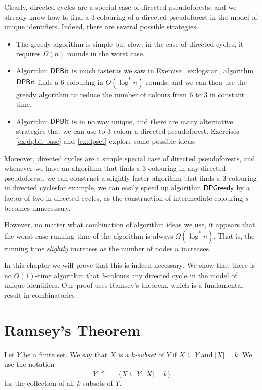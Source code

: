 Clearly, directed cycles are a special case of directed pseudoforests, and we already know how to find a $3$-colouring of a directed pseudoforest in the model of unique identifiers. Indeed, there are several possible strategies.
\begin{itemize}
    \item The greedy algorithm is simple but slow; in the case of directed cycles, it requires $\Omega(n)$ rounds in the worst case.
    \item Algorithm $\textsf{DPBit}$ is much faster\mydash as we saw in Exercise~\ref{ex:logstar}, algorithm $\textsf{DPBit}$ finds a $6$-colouring in $O(\log^* n)$ rounds, and we can then use the greedy algorithm to reduce the number of colours from $6$ to $3$ in constant time.
    \item Algorithm $\textsf{DPBit}$ is in no way unique, and there are many alternative strategies that we can use to $3$-colour a directed pseudoforest. Exercises \ref{ex:dpbit-base} and \ref{ex:dpset} explore some possible ideas.
\end{itemize}
Moreover, directed cycles are a simple special case of directed pseudoforests, and whenever we have an algorithm that finds a $3$-colouring in any directed pseudoforest, we can construct a slightly faster algorithm that finds a $3$-colouring in directed cycles\mydash for example, we can easily speed up algorithm $\textsf{DPGreedy}$ by a factor of two in directed cycles, as the construction of intermediate colouring $s$ becomes unnecessary.

However, no matter what combination of algorithm ideas we use, it appears that the worst-case running time of the algorithm is always $\Omega(\log^* n)$. That is, the running time \emph{slightly} increases as the number of nodes $n$ increases.

In this chapter we will prove that this is indeed necessary. We show that there is no $O(1)$-time algorithm that $3$-colours any directed cycle in the model of unique identifiers. Our proof uses Ramsey's theorem, which is a fundamental result in combinatorics.


\section{Ramsey's Theorem}

Let $Y$ be a finite set. We say that $X$ is a \emph{$k$-subset} of $Y$ if $X \subseteq Y$ and $|X| = k$. We use the notation
\[
    Y^{(k)} = \{ X \subseteq Y : |X| = k \}
\]
for the collection of all $k$-subsets of $Y$.


